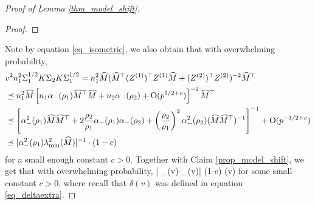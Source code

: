 \begin{proof}[Proof of Lemma \ref{thm_model_shift}]
\begin{proof}
\end{proof}
Note by equation \eqref{eq_isometric}, we also obtain that with overwhelming probability,
\begin{align*}
&v^2 n_1^2 \Sigma_1^{1/2} K \Sigma_2 K \Sigma_1^{1/2} =n_1^2 \widehat M (\widehat M^\top (Z^{(1)})^{\top} Z^{(1)} \widehat M + (Z^{(2)})^\top Z^{(2)})^{-2}\widehat M^\top \\
&\preceq  n_1^2 \widehat M \left[n_1 \alpha_-(\rho_1)\widehat M^\top \widehat M + n_2 \alpha_-(\rho_2) + \operatorname{O}(p^{1/2+{\mathit{e}}})\right]^{-2}\widehat M^\top \\
&\preceq  \left[ \alpha_-^2(\rho_1) \widehat M\widehat M^\top + 2\frac{\rho_2}{\rho_1} \alpha_-(\rho_1)\alpha_-(\rho_2) + \left(\frac{\rho_2}{\rho_1}\right)^2 \alpha_-^2(\rho_2) (\widehat M \widehat M^\top )^{-1}\right]^{-1}+  \operatorname{O}(p^{-1/2+{\mathit{e}}}) \\
&\preceq [\alpha_-^2(\rho_1) \lambda_{\min}^2(\widehat M)]^{-1}\cdot (1 - c)
\end{align*}
for a small enough constant $c>0$. Together with Claim \ref{prop_model_shift}, we get that with overwhelming probability,
\be\label{bounddelta-}
\left| \delta_{\bias}(v)-\wt\delta_{\bias}(v)\right|
		\le (1-c) \delta(v)
\ee
for some small constant $c>0$, where recall that $\delta(v)$ was defined in equation \eqref{eq_deltaextra}.



\end{proof}
